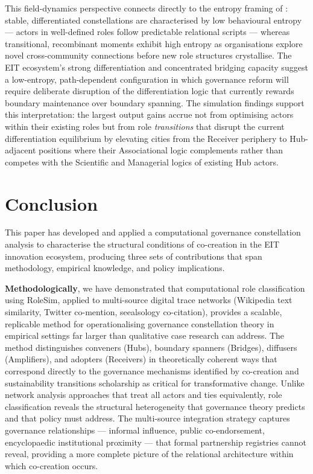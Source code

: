 \documentclass[review,12pt]{elsarticle}
\begin{document}
This field-dynamics perspective connects directly to the entropy framing of \citet{basole2023computational}: stable, differentiated constellations are characterised by low behavioural entropy --- actors in well-defined roles follow predictable relational scripts --- whereas transitional, recombinant moments exhibit high entropy as organisations explore novel cross-community connections before new role structures crystallise. The EIT ecosystem's strong differentiation and concentrated bridging capacity suggest a low-entropy, path-dependent configuration in which governance reform will require deliberate disruption of the differentiation logic that currently rewards boundary maintenance over boundary spanning. The simulation findings support this interpretation: the largest output gains accrue not from optimising actors within their existing roles but from role \emph{transitions} that disrupt the current differentiation equilibrium by elevating cities from the Receiver periphery to Hub-adjacent positions where their Associational logic complements rather than competes with the Scientific and Managerial logics of existing Hub actors.

\section{Conclusion}
\label{sec:conclusion}

This paper has developed and applied a computational governance constellation analysis to characterise the structural conditions of co-creation in the EIT innovation ecosystem, producing three sets of contributions that span methodology, empirical knowledge, and policy implications.

\textbf{Methodologically}, we have demonstrated that computational role classification using RoleSim, applied to multi-source digital trace networks (Wikipedia text similarity, Twitter co-mention, seealsology co-citation), provides a scalable, replicable method for operationalising governance constellation theory in empirical settings far larger than qualitative case research can address. The method distinguishes conveners (Hubs), boundary spanners (Bridges), diffusers (Amplifiers), and adopters (Receivers) in theoretically coherent ways that correspond directly to the governance mechanisms identified by co-creation and sustainability transitions scholarship as critical for transformative change. Unlike network analysis approaches that treat all actors and ties equivalently, role classification reveals the structural heterogeneity that governance theory predicts and that policy must address. The multi-source integration strategy captures governance relationships --- informal influence, public co-endorsement, encyclopaedic institutional proximity --- that formal partnership registries cannot reveal, providing a more complete picture of the relational architecture within which co-creation occurs.
\end{document}
